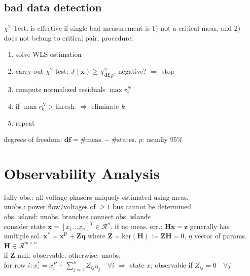 \documentclass[a4paper,10pt,landscape]{scrartcl}
\begin{document}
\begin{multicols*}{3}
\subsection{bad data detection}
$\chi^2$-Test. is effective if single bad measurement is 1) not a critical meas. and 2) does not belong to critical pair. procedure:
\begin{enumerate}
    \item solve WLS estimation
    \item carry out $\chi^2$ test: $J(\mathbf{x})\geq \chi^2_{\textbf{df},p}$. negative? $\Rightarrow$ stop
    \item compute normalized residuals $\max{r_i^N}$
    \item if $\max{r_k^N}>$thresh. $\Rightarrow$ eliminate $k$
    \item repeat
\end{enumerate}
degrees of freedom: $\textbf{df}=\#\text{meas.}-\#\text{states}$. $p$: usually $95\%$

\section{Observability Analysis}
fully obs.: all voltage phasors uniquely estimated using meas. \\
unobs.: power flow/voltages of $\geq1$ bus cannot be determined \\
obs. island: unobs. branches connect obs. islands \\
consider state $\mathbf{x}=\left[x_1\dots x_n\right]^T\in \mathcal{R}^n$. if no meas. err.: $\mathbf{Hx=z}$ generally has multiple sol. $\mathbf{x^*=x^P+Z\eta}$ where $\mathbf{Z}=\mathrm{ker}(\mathbf{H}):=\mathbf{ZH}=0$, $\eta$ vector of params. $\mathbf{H}\in\mathcal{R}^{m\times n}$ \\
if $\mathbf{Z}$ null: observable. otherwise: unobs. \\
for row $i:x_i^*=x_i^P + \sum_{j=1}^k Z_{ij}\eta_j \quad\forall i$ $\Rightarrow$ state $x_i$ observable if $Z_{ij}=0\quad\forall j$


\end{multicols*}
\end{document}
